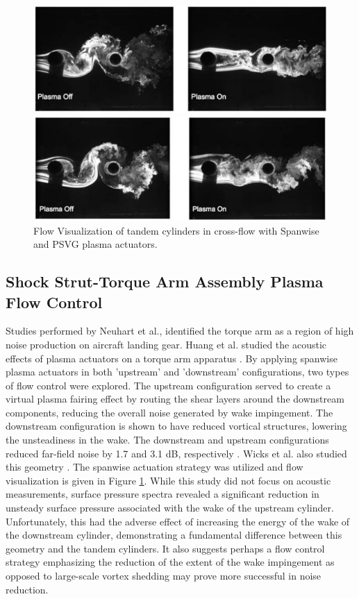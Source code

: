 \begin{figure}
	\begin{center}
		\centerline{\includegraphics[scale=1.0]{figures/tandem_span}}
		\centerline{\includegraphics[scale=1.0]{figures/tandem_psvg}}
		\caption{Flow Visualization of tandem cylinders in cross-flow with Spanwise and PSVG plasma actuators.}
		\label{fig:cyl2}
	\end{center}
\end{figure}

\subsection{Shock Strut-Torque Arm Assembly Plasma Flow Control}

Studies performed by Neuhart et al., identified the torque arm as a region of high noise production on aircraft landing gear. 
Huang et al. studied the acoustic effects of plasma actuators on a torque arm apparatus \cite{huang2010}. By applying spanwise plasma actuators in both 'upstream' and 'downstream' configurations, two types of flow control were explored. The upstream configuration served to create a virtual plasma fairing effect by routing the shear layers around the downstream components, reducing the overall noise generated by wake impingement. The downstream configuration is shown to have reduced vortical structures, lowering the unsteadiness in the wake. The downstream and upstream configurations reduced far-field noise by 1.7 and 3.1 dB, respectively \cite{huang2010}.
Wicks et al. also studied this geometry \cite{wicks2015}. The spanwise actuation strategy was utilized and flow visualization is given in Figure \ref{fig:cyl2}. While this study did not focus on acoustic measurements, surface pressure spectra revealed a significant reduction in unsteady surface pressure associated with the wake of the upstream cylinder. Unfortunately, this had the adverse effect of increasing the energy of the wake of the downstream cylinder, demonstrating a fundamental difference between this geometry and the tandem cylinders. It also suggests perhaps a flow control strategy emphasizing the reduction of the extent of the wake impingement as opposed to large-scale vortex shedding may prove more successful in noise reduction.

